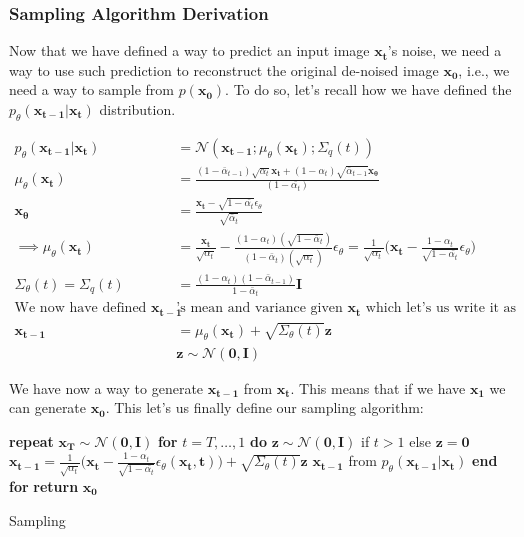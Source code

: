 \documentclass{article}
\begin{document}
\subsubsection{Sampling Algorithm Derivation}


Now that we have defined a way to predict an input image $\mathbf{x_t}$'s noise, we need a way to use such prediction to reconstruct the original de-noised image $\mathbf{x_0}$, i.e., we need a way to sample from $p(\mathbf{x_0})$. To do so, let's recall how we have defined the $p_\theta (\mathbf{x_{t-1} | x_t})$ distribution.


\begin{align}
	p_\theta(\mathbf{x_{t-1} | x_t}) &=   \mathcal{N}(\mathbf{x_{t-1}};  \mu_\theta(\mathbf{x_t}); \Sigma_q(t)) \\
	 \mu_\theta(\mathbf{x_t}) 	 &= \frac{(1-\bar{\alpha}_{t-1})\sqrt{\alpha_t} \mathbf{x_t} + (1- \alpha_t) \sqrt{\bar{\alpha}_{t-1}  } \mathbf{x_\theta}}{(1-\bar{\alpha_t})}\\
	 \mathbf{x_\theta}  &= \frac{\mathbf{x_t} -  \sqrt{1-\bar{\alpha_t}}\epsilon_\theta}{\sqrt{\bar\alpha_t}} \\
	 \implies  \mu_\theta(\mathbf{x_t}) &= \frac{\mathbf{x_t}}{\sqrt{\alpha_t}} - \frac{(1-\alpha_t)(\sqrt{1-\bar\alpha_t})}{(1-\bar\alpha_t)(\sqrt{\alpha_t})} \epsilon_\theta  = \frac{1}{\sqrt{\alpha_t}}\bigg( \mathbf{x_t} - \frac{1-\alpha_t}{\sqrt{1-\bar{\alpha_t}}}\epsilon_\theta\bigg) \\
	 \Sigma_\theta (t) = \Sigma_q(t) &= \frac{(1-\alpha_t)(1-\bar{\alpha}_{t-1})}{1 - \bar{\alpha}_t}  \mathbf{I} \\
	 \text{We now have defined   } \mathbf{x_{t-1}} &\text{'s mean and variance given   } \mathbf{x_t} \text{  which let's us write it as } \\
	 \mathbf{x_{t-1}} &= \mu_\theta(\mathbf{x_t}) + \sqrt{\Sigma_\theta(t)} \mathbf{z} \\
	 &\mathbf{z \sim \mathcal{N}(0, I)}	 
\end{align}

We have now a way to generate $\mathbf{x_{t-1}}$ from $\mathbf{x_t}$. This means that if we have $\mathbf{x_1}$ we can generate $\mathbf{x_0}$. This let's us finally define our sampling algorithm:

\begin{algorithm} 
	\begin{algorithmic}[1]
		\State \textbf{repeat}
		\State $\mathbf{x_T \sim \mathcal{N}(0, I)}$ 
		\State \textbf{for} $t =T, \hdots, 1 $ \textbf{do}
		\State $\mathbf{z \sim \mathcal{N}(0, I)}$ if $t > 1$ else $\mathbf{z = 0}$
		\State $\mathbf{x_{t-1}} =  \frac{1}{\sqrt{\alpha_t}}\bigg( \mathbf{x_t} - \frac{1-\alpha_t}{\sqrt{1-\bar{\alpha_t}}}\epsilon_\theta(\mathbf{x_t,t})\bigg) + \sqrt{\Sigma_\theta(t)} \mathbf{z} $   $\mathbf{x_{t-1}}$ from $p_\theta (\mathbf{x_{t-1} | x_t})$
		\State \textbf{end for}
		\State \textbf{return} $\mathbf{x_0}$
	\end{algorithmic} 
	\caption{Sampling}
	\label{alg:sampling}
\end{algorithm} 
\end{document}
